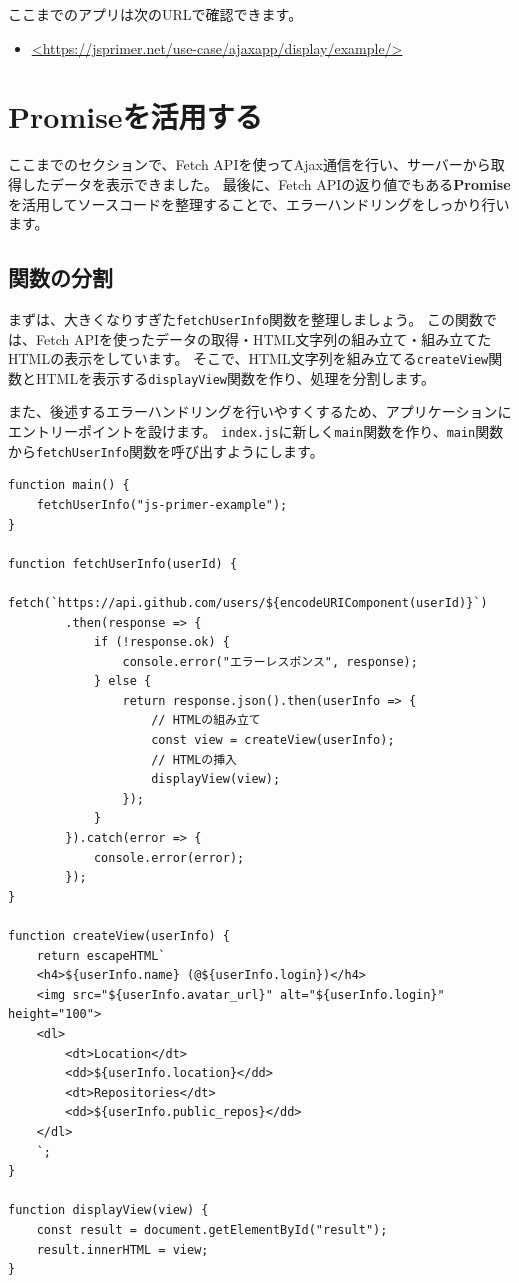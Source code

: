 ここまでのアプリは次のURLで確認できます。
\begin{itemize}
\item
  \url{<https://jsprimer.net/use-case/ajaxapp/display/example/>}
\end{itemize}

\hypertarget{use-promise}{%
\section{Promiseを活用する}\label{use-promise}}

ここまでのセクションで、Fetch
APIを使ってAjax通信を行い、サーバーから取得したデータを表示できました。
最後に、Fetch
APIの返り値でもある\textbf{Promise}を活用してソースコードを整理することで、エラーハンドリングをしっかり行います。

\hypertarget{split-function}{%
\subsection{関数の分割}\label{split-function}}

まずは、大きくなりすぎた\texttt{fetchUserInfo}関数を整理しましょう。
この関数では、Fetch
APIを使ったデータの取得・HTML文字列の組み立て・組み立てたHTMLの表示をしています。
そこで、HTML文字列を組み立てる\texttt{createView}関数とHTMLを表示する\texttt{displayView}関数を作り、処理を分割します。

また、後述するエラーハンドリングを行いやすくするため、アプリケーションにエントリーポイントを設けます。
\texttt{index.js}に新しく\texttt{main}関数を作り、\texttt{main}関数から\texttt{fetchUserInfo}関数を呼び出すようにします。

\begin{lstlisting}
function main() {
    fetchUserInfo("js-primer-example");
}

function fetchUserInfo(userId) {
    fetch(`https://api.github.com/users/${encodeURIComponent(userId)}`)
        .then(response => {
            if (!response.ok) {
                console.error("エラーレスポンス", response);
            } else {
                return response.json().then(userInfo => {
                    // HTMLの組み立て
                    const view = createView(userInfo);
                    // HTMLの挿入
                    displayView(view);
                });
            }
        }).catch(error => {
            console.error(error);
        });
}

function createView(userInfo) {
    return escapeHTML`
    <h4>${userInfo.name} (@${userInfo.login})</h4>
    <img src="${userInfo.avatar_url}" alt="${userInfo.login}" height="100">
    <dl>
        <dt>Location</dt>
        <dd>${userInfo.location}</dd>
        <dt>Repositories</dt>
        <dd>${userInfo.public_repos}</dd>
    </dl>
    `;
}

function displayView(view) {
    const result = document.getElementById("result");
    result.innerHTML = view;
}
\end{lstlisting}

